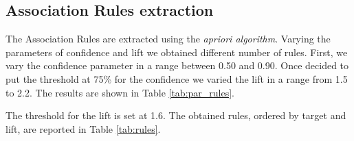 \documentclass[a4paper,11pt,dvipsnames]{article}
\begin{document}
\begin{minipage}{0.48\linewidth}
\centering
\begin{table}[H]
    \centering
            \caption{Prediction and counts for missing values} \label{tab:miss_ass}

\end{table}

\end{minipage}

\subsection{Association Rules extraction}
The Association Rules are extracted using the \textit{apriori algorithm}.
Varying the parameters of confidence and lift we obtained different number of rules. First, we vary the confidence parameter in a range between 0.50 and 0.90. Once decided to put the threshold at 75\% for the confidence we varied the lift in a range from 1.5 to 2.2. The results are shown in Table \ref{tab:par_rules}.


The threshold for the lift is set at 1.6. The obtained rules, ordered by target and lift, are reported in Table \ref{tab:rules}.
\end{document}
